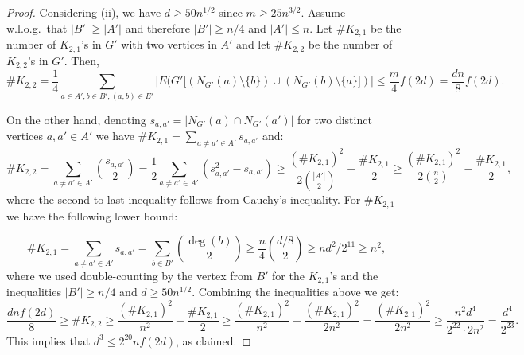 \documentclass[10pt,a4paper]{amsart}
\begin{document}
\begin{proof}
	Considering (ii), we have $d\ge 50n^{1/2}$ since $m\ge 25n^{3/2}$.  Assume w.l.o.g.\ that $|B'|\ge |A'|$ 
	and therefore $|B'| \ge n/4$ and $|A'| \le n$.
	Let $\#K_{2,1}$ be the number of $K_{2,1}$'s in $G'$ with two vertices in $A'$ and 
	let $\#K_{2,2}$ be the number of $K_{2,2}$'s in $G'$.
	Then,
	$$\#K_{2,2} =  \frac{1}{4}\sum_{a \in A', b \in B', (a,b) \in E'}  |E(G'[(N_{G'}(a)\setminus \{b\})\cup (N_{G'}(b)\setminus\{a\}])| \le \frac{m}{4}f(2d) = \frac{dn}{8} f(2d).$$ 
	
	On the other hand, denoting $s_{a,a'}=|N_{G'}(a)\cap N_{G'}(a')|$ for two distinct vertices $a, a'\in A'$ we have $\#K_{2,1} = \sum_{a\ne a' \in A'} s_{a,a'}$ and:
	$$\#K_{2,2}=\sum_{a\ne a'\in A'}\binom{s_{a,a'}}{2}=\frac{1}{2}\sum_{a\ne a'\in A'}(s_{a,a'}^2-s_{a,a'}) \ge \frac{(\#K_{2,1})^2}{2\binom{|A'|}{2}}-\frac{\#K_{2,1}}{2}\ge \frac{(\#K_{2,1})^2}{2\binom{n}{2}}-\frac{\#K_{2,1}}{2},$$
	where the second to last inequality follows from Cauchy's inequality. 
	For $\#K_{2,1}$ we have the following lower bound:	
	
	$$\#K_{2,1}=\sum_{a\ne a'\in A'}s_{a,a'} = \sum_{b \in B'} \binom{\deg(b)}{2} \ge \frac{n}{4}\binom{d/8}{2}\ge nd^2/2^{11}\ge n^2,$$
	where we used double-counting by the vertex from $B'$ for the $K_{2,1}$'s and the inequalities $|B'|\ge n/4$ and $d\ge 50n^{1/2}$. Combining the inequalities above we get:
	$$\frac{dnf(2d)}{8} \ge \#K_{2,2} \ge \frac{(\#K_{2,1})^2}{n^2}-\frac{\#K_{2,1}}{2} \ge \frac{(\#K_{2,1})^2}{n^2}-\frac{(\#K_{2,1})^2}{2n^2} = \frac{(\#K_{2,1})^2}{2n^2} \ge \frac{n^2d^4}{2^{22}\cdot 2n^2}=\frac{d^4}{2^{23}}.$$	
	This implies that $d^3\le 2^{20}nf(2d)$, as claimed.
\end{proof}
\end{document}
